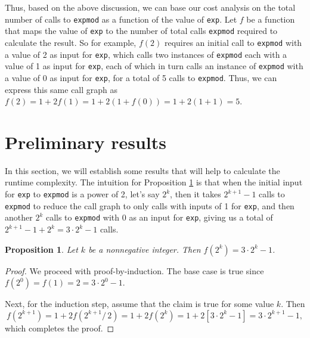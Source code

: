 \documentclass{article}
\newtheorem{proposition}{Proposition}
\begin{document}
Thus, based on the above discussion, we can base our cost analysis on the total
number of calls to \lstinline{expmod} as a function of the value of
\lstinline{exp}.  Let $f$ be a function that maps the value of \lstinline{exp}
to the number of total calls \lstinline{expmod} required to calculate the
result.  So for example, $f(2)$ requires an initial call to \lstinline{expmod}
with a value of 2 as input for \lstinline{exp}, which calls two instances of
\lstinline{expmod} each with a value of 1 as input for \lstinline{exp}, each of
which in turn calls an instance of \lstinline{expmod} with a value of 0 as input
for \lstinline{exp}, for a total of 5 calls to \lstinline{expmod}.  Thus, we can
express this same call graph as
$f(2) = 1 + 2 f(1) = 1 + 2(1 + f(0)) = 1 + 2(1 + 1) = 5$.




\section{Preliminary results}

In this section, we will establish some results that will help to calculate the
runtime complexity.  The intuition for Proposition \ref{thm:f-powers-of-two} is
that when the initial input for \lstinline{exp} to \lstinline{expmod} is a power
of 2, let's say $2^k$, then it takes $2^{k + 1} - 1$ calls to \lstinline{expmod}
to reduce the call graph to only calls with inputs of 1 for \lstinline{exp}, and
then another $2^k$ calls to \lstinline{expmod} with 0 as an input for
\lstinline{exp}, giving us a total of $2^{k + 1} - 1 + 2^k = 3 \cdot 2^k - 1$
calls.

\begin{proposition}
  \label{thm:f-powers-of-two}
  Let $k$ be a nonnegative integer.  Then $f(2^k) = 3 \cdot 2^k - 1$.
\end{proposition}

\begin{proof}
  We proceed with proof-by-induction.  The base case is true since
  $f(2^0) = f(1) = 2 = 3 \cdot 2^0 - 1$.

  Next, for the induction step, assume that the claim is true for some value
  $k$.  Then
  \begin{equation*}
    f(2^{k + 1})
    = 1 + 2f(2^{k + 1} /\, 2)
    = 1 + 2f(2^k)
    = 1 + 2 \left[3 \cdot 2^k - 1 \right]
    = 3 \cdot 2^{k + 1} - 1,
  \end{equation*}
  which completes the proof.
\end{proof}
\end{document}
